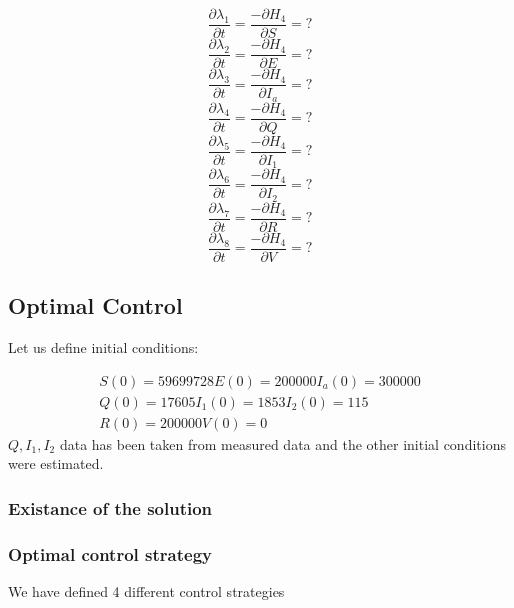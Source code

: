 \documentclass[a4paper]{article}
\begin{document}
\begin{equation*}
\frac{{\partial}\lambda _1}{{\partial}t}=\frac{-{\partial}H_4}{{\partial}S}=?
\end{equation*}
\begin{equation*}
\frac{{\partial}\lambda _2}{{\partial}t}=\frac{-{\partial}H_4}{{\partial}E}=?
\end{equation*}
\begin{equation*}
\frac{{\partial}\lambda _3}{{\partial}t}=\frac{-{\partial}H_4}{{\partial}I_a}=?
\end{equation*}
\begin{equation*}
\frac{{\partial}\lambda _4}{{\partial}t}=\frac{-{\partial}H_4}{{\partial}Q}=?
\end{equation*}
\begin{equation*}
\frac{{\partial}\lambda _5}{{\partial}t}=\frac{-{\partial}H_4}{{\partial}I_1}=?
\end{equation*}
\begin{equation*}
\frac{{\partial}\lambda _6}{{\partial}t}=\frac{-{\partial}H_4}{{\partial}I_2}=?
\end{equation*}
\begin{equation*}
\frac{{\partial}\lambda _7}{{\partial}t}=\frac{-{\partial}H_4}{{\partial}R}=?
\end{equation*}
\begin{equation*}
\frac{{\partial}\lambda _8}{{\partial}t}=\frac{-{\partial}H_4}{{\partial}V}=?
\end{equation*}

\bigskip


\bigskip

\subsection{Optimal Control }
\hypertarget{Toc66707027}{}Let us define initial conditions:

\begin{equation*}
\begin{matrix}S\left(0\right)=59699728E\left(0\right)=200000I_a\left(0\right)=300000\\Q\left(0\right)=17605I_1\left(0\right)=1853I_2\left(0\right)=115\\R\left(0\right)=200000V\left(0\right)=0\end{matrix}
\end{equation*}
 $Q,I_1,I_2$ data has been taken from measured data and the other initial conditions were estimated.

\subsubsection{Existance of the solution}
\hypertarget{Toc66707028}{}\subsubsection{Optimal control strategy}
\hypertarget{Toc66707029}{}We have defined 4 different control strategies \ 
\end{document}

